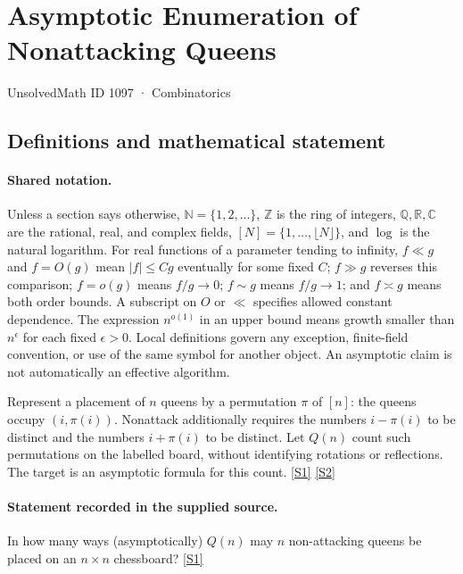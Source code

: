 \documentclass[11pt,a4paper]{article}
\newcommand{\N}{\mathbb{N}}
\newcommand{\Z}{\mathbb{Z}}
\newcommand{\Q}{\mathbb{Q}}
\newcommand{\R}{\mathbb{R}}
\newcommand{\C}{\mathbb{C}}
\newcommand{\sref}[2]{\hyperlink{source:#1:#2}{[S#2]}}
\begin{document}

\setcounter{section}{1096}

\section{Asymptotic Enumeration of Nonattacking Queens}\label{1097}

{\small\sffamily UnsolvedMath ID 1097 · Combinatorics}

\subsection{Definitions and mathematical statement}

\paragraph{Shared notation.}Unless a section says otherwise, $\N=\{1,2,\ldots\}$,
$\Z$ is the ring of integers, $\Q,\R,\C$ are the rational, real, and complex
fields, $[N]=\{1,\ldots,\lfloor N\rfloor\}$, and $\log$ is the natural
logarithm. For real functions of a parameter tending to infinity,
$f\ll g$ and $f=O(g)$ mean $|f|\leq Cg$ eventually for some fixed $C$;
$f\gg g$ reverses this comparison; $f=o(g)$ means $f/g\to0$;
$f\sim g$ means $f/g\to1$; and $f\asymp g$ means both order bounds.
A subscript on $O$ or $\ll$ specifies allowed constant dependence.
The expression $n^{o(1)}$ in an upper bound means growth smaller than
$n^\epsilon$ for each fixed $\epsilon>0$. Local definitions govern any
exception, finite-field convention, or use of the same symbol for another
object. An asymptotic claim is not automatically an effective algorithm.



Represent a placement of $n$ queens by a permutation $\pi$ of $[n]$: the queens occupy $(i,\pi(i))$. Nonattack additionally requires the numbers $i-\pi(i)$ to be distinct and the numbers $i+\pi(i)$ to be distinct. Let $Q(n)$ count such permutations on the labelled board, without identifying rotations or reflections. The target is an asymptotic formula for this count. \sref{1097}{1} \sref{1097}{2}

\paragraph{Statement recorded in the supplied source.}
In how many ways (asymptotically) $Q(n)$ may $n$ non-attacking queens be placed on an $n \times n$ chessboard? \sref{1097}{1}
\end{document}
